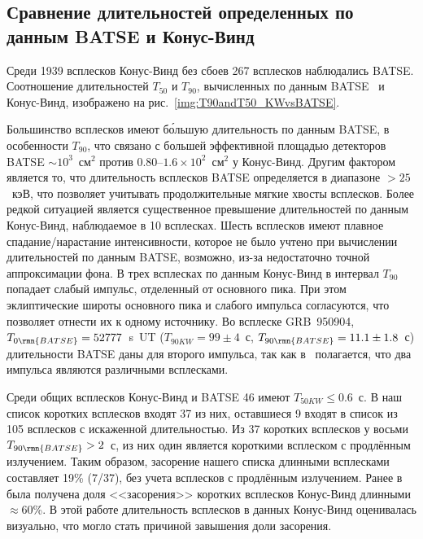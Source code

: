 \begin{landscape}

\end{landscape}

\subsection{Сравнение длительностей определенных по данным BATSE и Конус-Винд}
Среди 1939 всплесков Конус-Винд без сбоев 267 всплесков наблюдались BATSE. 
Соотношение длительностей $T_{50}$ и $T_{90}$, вычисленных по данным BATSE~\citep{Paciesas_1999} 
и Конус-Винд, изображено на рис.~\ref{img:T90andT50_KWvsBATSE}.

Большинство всплесков имеют б\'{о}льшую длительность по данным BATSE, 
в особенности $T_{90}$, что связано с большей  эффективной площадью детекторов 
BATSE $\sim 10^3$~см$^2$ против 0.80--$1.6\times 10^2$~см$^2$ у Конус-Винд. 
Другим фактором является то, что длительность всплесков BATSE определяется в 
диапазоне $>25$~кэВ, что позволяет учитывать продолжительные мягкие хвосты всплесков. 
Более редкой ситуацией является существенное превышение длительностей по данным Конус-Винд, 
наблюдаемое в 10 всплесках. Шесть всплесков имеют плавное спадание/нарастание интенсивности, 
которое не было учтено при вычислении  длительностей по данным BATSE, возможно, 
из-за недостаточно точной аппроксимации фона. В трех всплесках по данным Конус-Винд 
в интервал $T_{90}$ попадает слабый импульс, отделенный от основного пика. 
При этом эклиптические широты основного пика и слабого импульса согласуются, 
что позволяет отнести их к одному источнику. Во всплеске GRB~950904, 
$T_{0 \rmn{BATSE}} = 52777$~s~UT ($T_{90{KW}} = 99 \pm 4$~с, $T_{90\rmn{BATSE}} = 11.1\pm 1.8$~с) 
длительности BATSE даны для второго импульса, так как в~\citep{Hurley_2005} полагается, 
что два импульса являются различными всплесками.

Среди общих всплесков Конус-Винд и BATSE 46 имеют $T_{50{KW}} \leq 0.6$~с. 
В наш список коротких всплесков входят 37 из них, оставшиеся 9 входят в список из 105 
всплесков с искаженной длительностью. Из 37 коротких всплесков у восьми $T_{90\rmn{BATSE}} > 2$~с, 
из них один является короткими всплеском с продлённым излучением. Таким образом, 
засорение нашего списка длинными всплесками составляет 19\% (7/37), без учета 
всплесков с продлённым излучением. Ранее в~\citep{Ofek_2007ApJ} была получена доля 
<<засорения>> коротких всплесков Конус-Винд длинными $\approx 60$\%. В этой работе 
длительность всплесков в данных Конус-Винд оценивалась визуально, что могло 
стать причиной завышения доли засорения. 

